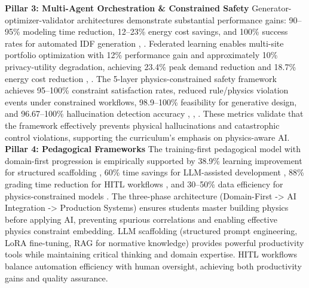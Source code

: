 \documentclass[12pt,a4paper]{article}
\begin{document}
\textbf{Pillar 3: Multi-Agent Orchestration \& Constrained Safety}
Generator-optimizer-validator architectures demonstrate substantial performance gains: 90--95\% modeling time reduction, 12--23\% energy cost savings, and 100\% success rates for automated IDF generation \cite{ref123}, \cite{ref36}. Federated learning enables multi-site portfolio optimization with 12\% performance gain and approximately 10\% privacy-utility degradation, achieving 23.4\% peak demand reduction and 18.7\% energy cost reduction \cite{ref58}, \cite{ref47}.
The 5-layer physics-constrained safety framework achieves 95--100\% constraint satisfaction rates, reduced rule/physics violation events under constrained workflows, 98.9--100\% feasibility for generative design, and 96.67--100\% hallucination detection accuracy \cite{ref52}, \cite{ref56}, \cite{ref123}. These metrics validate that the framework effectively prevents physical hallucinations and catastrophic control violations, supporting the curriculum's emphasis on physics-aware AI.
\textbf{Pillar 4: Pedagogical Frameworks}
The training-first pedagogical model with domain-first progression is empirically supported by 38.9\% learning improvement for structured scaffolding \cite{ref4}, 60\% time savings for LLM-assisted development \cite{ref61}, 88\% grading time reduction for HITL workflows \cite{ref19}, and 30--50\% data efficiency for physics-constrained models \cite{ref265}. The three-phase architecture (Domain-First -> AI Integration -> Production Systems) ensures students master building physics before applying AI, preventing spurious correlations and enabling effective physics constraint embedding.
LLM scaffolding (structured prompt engineering, LoRA fine-tuning, RAG for normative knowledge) provides powerful productivity tools while maintaining critical thinking and domain expertise. HITL workflows balance automation efficiency with human oversight, achieving both productivity gains and quality assurance.
\end{document}
